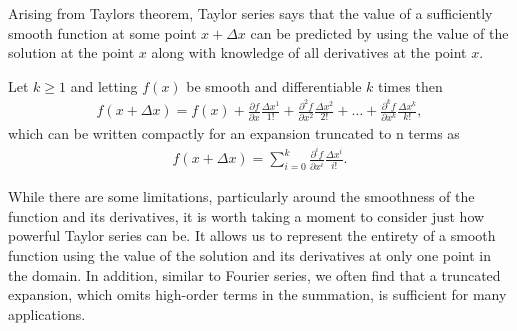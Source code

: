 Arising from Taylors theorem, Taylor series says that the value of a sufficiently smooth function at some point $x + \Delta x$ can be predicted by using the value of the solution at the point $x$ along with knowledge of all derivatives at the point $x$.
\begin{theorem}
Let $k \geq 1$ and letting $f(x)$ be smooth and differentiable $k$ times then
\begin{align}
f(x + \Delta x) = f(x) + \frac{\partial f}{\partial x}\frac{\Delta x^1}{1!} + \frac{\partial^2 f}{\partial x^2}\frac{\Delta x^2}{2!} + \hdots + \frac{\partial^k f}{\partial x^k}\frac{\Delta x^k}{k!},
\end{align}
which can be written compactly for an expansion truncated to n terms as
\begin{align}
f(x + \Delta x) = \sum_{i=0}^{k} \frac{\partial^i f}{\partial x^i}\frac{\Delta x^i}{i!}.
\end{align}
\end{theorem}
While there are some limitations, particularly around the smoothness of the function and its derivatives, it is worth taking a moment to consider just how powerful Taylor series can be. It allows us to represent the entirety of a smooth function using the value of the solution and its derivatives at only one point in the domain. In addition, similar to Fourier series, we often find that a truncated expansion, which omits high-order terms in the summation, is sufficient for many applications.

